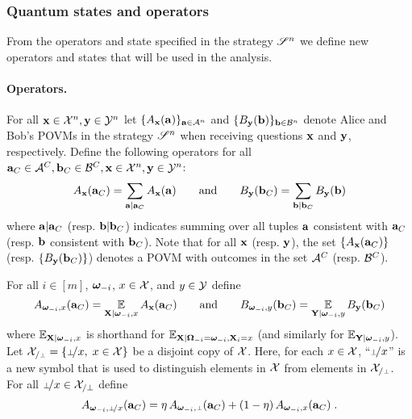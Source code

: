 \subsubsection{Quantum states and operators}
\label{sec:states-operators} 

From the operators and state specified in the strategy $\mathscr{S}^n$ we define new operators and states that will be used in the analysis.

\paragraph{Operators.} For all $\mathbf{x} \in \mathcal{X}^n, \mathbf{y} \in \mathcal{Y}^n$ let $\{A_{\mathbf{x}}(\mathbf{a})\}_{\mathbf{a} \in \mathcal{A}^n}$ and $\{B_{\mathbf{y}}(\mathbf{b})\}_{\mathbf{b} \in \mathcal{B}^n}$ denote Alice and Bob's POVMs in the strategy $\mathscr{S}^n$ when receiving questions $\mathbf{x}$ and $\mathbf{y}$, respectively. Define the following operators for all $\mathbf{a}_C \in \mathcal{A}^C, \mathbf{b}_C \in \mathcal{B}^C, \mathbf{x} \in \mathcal{X}^n, \mathbf{y} \in \mathcal{Y}^n$:
\begin{equation}
\label{eq:states-operators-1}
	A_{\mathbf{x}}(\mathbf{a}_C) = \sum_{\mathbf{a} | \mathbf{a}_C} A_{\mathbf{x}}(\mathbf{a}) \qquad\text{and} \qquad B_{\mathbf{y}}(\mathbf{b}_C) = \sum_{\mathbf{b} | \mathbf{b}_C} B_{\mathbf{y}}(\mathbf{b})
\end{equation}
where $\mathbf{a} | \mathbf{a}_C$ (resp. $\mathbf{b} | \mathbf{b}_C$) indicates summing over all tuples $\mathbf{a}$ consistent with $\mathbf{a}_C$ (resp. $\mathbf{b}$ consistent with $\mathbf{b}_C$). Note that for all $\mathbf{x}$ (resp. $\mathbf{y}$), the set $\{ A_{\mathbf{x}}(\mathbf{a}_C) \}$ (resp. $\{ B_{\mathbf{y}}(\mathbf{b}_C) \}$) denotes a POVM with outcomes in the set $\mathcal{A}^C$ (resp. $\mathcal{B}^C$).

For all $i \in [m]$, ${\boldsymbol{\omega}}_{-i}$, $x \in \mathcal{X}$, and $y \in \mathcal{Y}$ define
\begin{equation}
\label{eq:states-operators-2}
 A_{{\boldsymbol{\omega}}_{-i}, x}(\mathbf{a}_C) = \operatorname*{\mathbb{E}}_{\mathbf{X} | {\boldsymbol{\omega}}_{-i}, x} A_{\mathbf{x}}(\mathbf{a}_C) \qquad \text{and} \qquad  B_{{\boldsymbol{\omega}}_{-i}, y}(\mathbf{b}_C) = \operatorname*{\mathbb{E}}_{\mathbf{Y} | {\boldsymbol{\omega}}_{-i}, y} B_{\mathbf{y}}(\mathbf{b}_C)
\end{equation}
where $\operatorname*{\mathbb{E}}_{\mathbf{X} | {\boldsymbol{\omega}}_{-i}, x}$ is shorthand for $\operatorname*{\mathbb{E}}_{\mathbf{X} | {\boldsymbol{\Omega}}_{-i} = {\boldsymbol{\omega}}_{-i}, \mathbf{X}_i = x}$ (and similarly for $\operatorname*{\mathbb{E}}_{\mathbf{Y} | {\boldsymbol{\omega}}_{-i}, y}$).
Let $\X_{/\dummy} = \{ \dummyx,\; x\in \X\}$ be a disjoint copy of $\mathcal{X}$. Here, for each $x\in \mathcal{X}$, ``$\dummyx$'' is a new symbol that is used to distinguish elements in $\mathcal{X}$ from elements in $\X_{/\dummy}$. 
For all $\dummyx \in \X_{/\perp}$ define
\begin{equation}
\label{eq:states-operators-3}
	A_{\bomega_\mi,\dummyx}(\ba_C) = \eta \, A_{\bomega_\mi,\dummy}(\ba_C) + (1 - \eta) \, A_{\bomega_\mi,x}(\ba_C)\;.
\end{equation}

